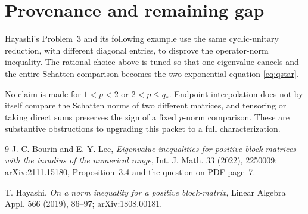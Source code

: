 \documentclass[11pt]{article}
\begin{document}
\section{Provenance and remaining gap}

Hayashi's Problem~3 and its following example \cite[PDF pp.~5--6]{Hay}
use the same cyclic-unitary reduction, with different diagonal entries, to
disprove the operator-norm inequality.  The rational choice above is tuned
so that one eigenvalue cancels and the entire Schatten comparison becomes
the two-exponential equation \eqref{eq:qstar}.

No claim is made for $1<p<2$ or $2<p\leq q_*$.  Endpoint interpolation does
not by itself compare the Schatten norms of two different matrices, and
tensoring or taking direct sums preserves the sign of a fixed $p$-norm
comparison.  These are substantive obstructions to upgrading this packet
to a full characterization.

\begin{thebibliography}{9}
J.-C. Bourin and E.-Y. Lee,
\emph{Eigenvalue inequalities for positive block matrices with the inradius
of the numerical range}, Int. J. Math. 33 (2022), 2250009;
arXiv:2111.15180, Proposition~3.4 and the question on PDF page~7.

T. Hayashi, \emph{On a norm inequality for a positive block-matrix},
Linear Algebra Appl. 566 (2019), 86--97; arXiv:1808.00181.
\end{thebibliography}
\end{document}
